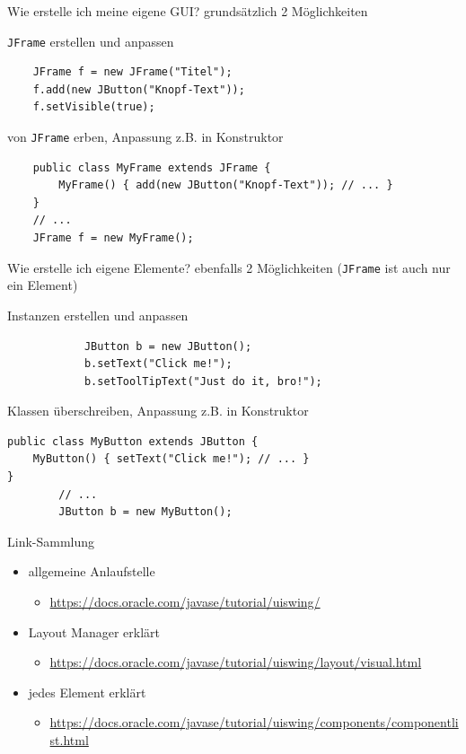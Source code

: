 \documentclass[18pt]{beamer}
\begin{document}
\begin{frame}[fragile]{Wie erstelle ich meine eigene GUI?}
grundsätzlich 2 Möglichkeiten
\begin{block}{\texttt{JFrame} erstellen und anpassen}
	\begin{verbatim}
	JFrame f = new JFrame("Titel");
	f.add(new JButton("Knopf-Text"));
	f.setVisible(true);
	\end{verbatim}
\end{block}
\pause
\begin{block}{von \texttt{JFrame} erben, Anpassung z.B. in Konstruktor}
	\begin{verbatim}
	public class MyFrame extends JFrame { 
	    MyFrame() { add(new JButton("Knopf-Text")); // ... } 
	}
	// ...
	JFrame f = new MyFrame();
	\end{verbatim}
\end{block}
\end{frame}

\begin{frame}[fragile]{Wie erstelle ich eigene Elemente?}
	ebenfalls 2 Möglichkeiten (\texttt{JFrame} ist auch nur ein Element)
	\begin{block}{Instanzen erstellen und anpassen}
		\begin{verbatim}
			JButton b = new JButton();
			b.setText("Click me!");
			b.setToolTipText("Just do it, bro!");
		\end{verbatim}
	\end{block}
	\pause
		\begin{block}{Klassen überschreiben, Anpassung z.B. in Konstruktor}
		\begin{verbatim}
public class MyButton extends JButton { 
    MyButton() { setText("Click me!"); // ... } 
}
		// ...
		JButton b = new MyButton();
		\end{verbatim}
	\end{block}
\end{frame}


\begin{frame}{Link-Sammlung}
	\begin{itemize}
		\item allgemeine Anlaufstelle
		\begin{itemize}
			\item \url{https://docs.oracle.com/javase/tutorial/uiswing/}
		\end{itemize}
		\item Layout Manager erklärt
		\begin{itemize}
			\item \url{https://docs.oracle.com/javase/tutorial/uiswing/layout/visual.html}
		\end{itemize}
		\item jedes Element erklärt
		\begin{itemize}
			\item \url{https://docs.oracle.com/javase/tutorial/uiswing/components/componentlist.html}
		\end{itemize}
	\end{itemize}	
\end{frame}
\end{document}
